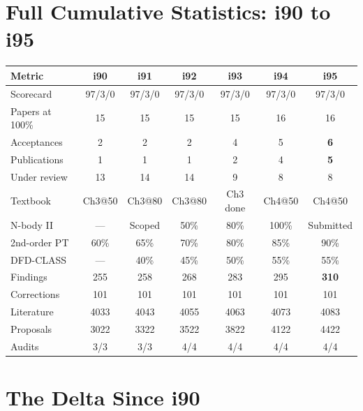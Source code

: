 \documentclass[11pt,a4paper]{article}
\begin{document}
\section{Full Cumulative Statistics: i90 to i95}

\begin{center}
\begin{tabular}{lcccccc}
\toprule
\textbf{Metric} & \textbf{i90} & \textbf{i91} & \textbf{i92} & \textbf{i93} & \textbf{i94} & \textbf{i95} \\
\midrule
Scorecard & 97/3/0 & 97/3/0 & 97/3/0 & 97/3/0 & 97/3/0 & 97/3/0 \\
Papers at 100\% & 15 & 15 & 15 & 15 & 16 & 16 \\
Acceptances & 2 & 2 & 2 & 4 & 5 & \textbf{6} \\
Publications & 1 & 1 & 1 & 2 & 4 & \textbf{5} \\
Under review & 13 & 14 & 14 & 9 & 8 & 8 \\
Textbook & Ch3@50 & Ch3@80 & Ch3@80 & Ch3 done & Ch4@50 & Ch4@50 \\
N-body II & --- & Scoped & 50\% & 80\% & 100\% & Submitted \\
2nd-order PT & 60\% & 65\% & 70\% & 80\% & 85\% & 90\% \\
DFD-CLASS & --- & 40\% & 45\% & 50\% & 55\% & 55\% \\
Findings & 255 & 258 & 268 & 283 & 295 & \textbf{310} \\
Corrections & 101 & 101 & 101 & 101 & 101 & 101 \\
Literature & 4033 & 4043 & 4055 & 4063 & 4073 & 4083 \\
Proposals & 3022 & 3322 & 3522 & 3822 & 4122 & 4422 \\
Audits & 3/3 & 3/3 & 4/4 & 4/4 & 4/4 & 4/4 \\
\bottomrule
\end{tabular}
\end{center}

\section{The Delta Since i90}
\end{document}
